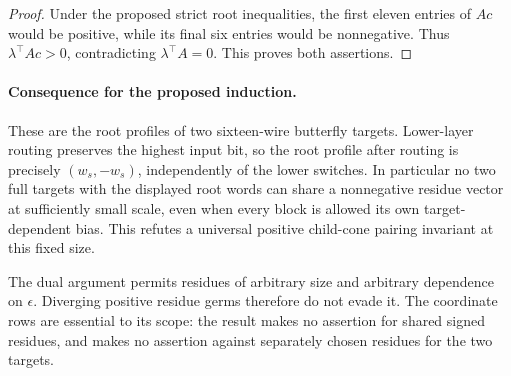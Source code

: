 \documentclass[11pt]{article}
\begin{document}
\begin{proof}
Under the proposed strict root inequalities, the first eleven
entries of $Ac$ would be positive, while its final six entries would
be nonnegative. Thus $\lambda^\top Ac>0$, contradicting
$\lambda^\top A=0$. This proves both assertions.
\end{proof}

\paragraph{Consequence for the proposed induction.}
These are the root profiles of two sixteen-wire butterfly targets.
Lower-layer routing preserves the highest input bit, so the root
profile after routing is precisely $(w_s,-w_s)$, independently of
the lower switches. In particular no two full targets with the
displayed root words can share a nonnegative residue vector at
sufficiently small scale, even when every block is allowed its own
target-dependent bias. This refutes a universal positive child-cone
pairing invariant at this fixed size.

The dual argument permits residues of arbitrary size and arbitrary
dependence on $\epsilon$. Diverging positive residue germs therefore
do not evade it. The coordinate rows are essential to its scope:
the result makes no assertion for shared signed residues, and makes
no assertion against separately chosen residues for the two targets.
\end{document}
